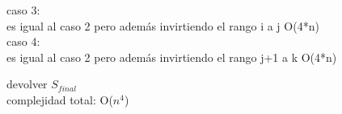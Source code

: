 \begin{algorithm}[H]
{{{{{				 
				 caso 3:\\
				 es igual al caso 2 pero además invirtiendo el rango i a j \hfill O(4*n)\\
				 
				 
				 caso 4: \\
				 es igual al caso 2 pero además invirtiendo el rango j+1 a k \hfill O(4*n)\\
				}
			}	
		}	
	}
	

	devolver $S_{final}$ \\

	\hfill complejidad total: O($n^4$)\\
}

\end{algorithm}

\begin{algorithm}[H]


\end{algorithm}

